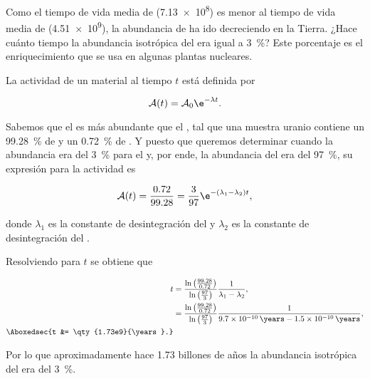 \documentclass[./../main.tex]{subfiles}
\begin{document}
    \begin{exercise}
        Como el tiempo de vida media de  (\qty{7.13e8}{\years}) es menor al tiempo de vida media de  (\qty{4.51e9}{\years}), la abundancia de  ha ido decreciendo en la Tierra. ¿Hace cuánto tiempo la abundancia isotrópica del  era igual a \SI{3}{\percent}? Este porcentaje es el enriquecimiento que se usa en algunas plantas nucleares.

        \begin{solution}
            La actividad de un material al tiempo \(t\) está definida por

			\begin{equation}
				\mathcal{A}(t) = \mathcal{A}_{0}\e^{-\lambda t}.
				\label{eq:activity}
			\end{equation}

            Sabemos que el  es más abundante que el , tal que una muestra uranio contiene un \qty{99.28}{\percent} de  y un \qty{0.72}{\percent} de . Y puesto que queremos determinar cuando la abundancia era del \qty{3}{\percent} para el  y, por ende, la abundancia del  era del \qty{97}{\percent}, su expresión para la actividad es

            \begin{equation*}
                \mathcal{A}(t) = \dfrac{\num{0.72}}{\num{99.28}} = \dfrac{3}{97}\e^{-(\lambda_{1} - \lambda_{2})t},
            \end{equation*}

            donde \(\lambda_{1}\) es la constante de desintegración del  y \(\lambda_{2}\) es la constante de desintegración del . 

            Resolviendo para \(t\) se obtiene que

            \begin{align*}
                t &= \dfrac{\ln\left(\tfrac{\num{99.28}}{\num{0.72}}\right)}{\ln\left(\tfrac{97}{3}\right)}\dfrac{1}{\lambda_{1} - \lambda_{2}},\\
            &= \dfrac{\ln\left(\tfrac{\num{99.28}}{\num{0.72}}\right)}{\ln\left(\tfrac{97}{3}\right)}\dfrac{1}{\qty{9.7e-10}{\per\years} - \qty{1.5e-10}{\per\years}},\\
                \Aboxedsec{t &= \qty{1.73e9}{\years}.}
            \end{align*}

            Por lo que aproximadamente hace \num{1.73} billones de años la abundancia isotrópica del  era del \SI{3}{\percent}.

        \end{solution}
    \end{exercise}
\end{document}
